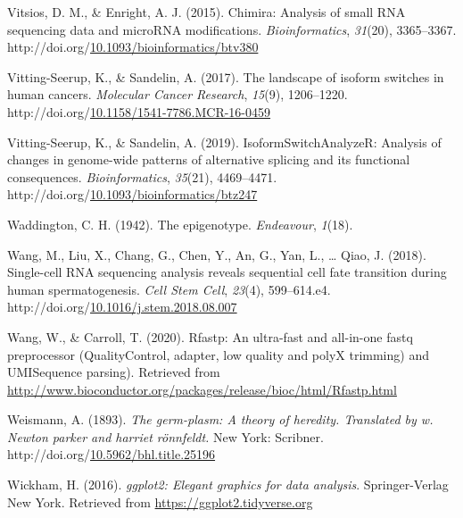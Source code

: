 \documentclass[12pt,twoside]{reedthesis}
\newlength{\cslhangindent}
\newenvironment{CSLReferences}[2] %
 {%
  \setlength{\parindent}{0pt}
  \ifodd #1 \everypar{\setlength{\hangindent}{\cslhangindent}}\ignorespaces\fi
  \ifnum #2 > 0
  \setlength{\parskip}{#2\baselineskip}
  \fi
 }%
 {}
\begin{document}
\begin{CSLReferences}{1}{0}
\leavevmode{}%
Vitsios, D. M., \& Enright, A. J. (2015). Chimira: Analysis of small RNA sequencing data and microRNA modifications. \emph{Bioinformatics}, \emph{31}(20), 3365--3367. http://doi.org/\href{https://doi.org/10.1093/bioinformatics/btv380}{10.1093/bioinformatics/btv380}

\leavevmode{}%
Vitting-Seerup, K., \& Sandelin, A. (2017). The landscape of isoform switches in human cancers. \emph{Molecular Cancer Research}, \emph{15}(9), 1206--1220. http://doi.org/\href{https://doi.org/10.1158/1541-7786.MCR-16-0459}{10.1158/1541-7786.MCR-16-0459}

\leavevmode{}%
Vitting-Seerup, K., \& Sandelin, A. (2019). IsoformSwitchAnalyzeR: Analysis of changes in genome-wide patterns of alternative splicing and its functional consequences. \emph{Bioinformatics}, \emph{35}(21), 4469--4471. http://doi.org/\href{https://doi.org/10.1093/bioinformatics/btz247}{10.1093/bioinformatics/btz247}

\leavevmode{}%
Waddington, C. H. (1942). The epigenotype. \emph{Endeavour}, \emph{1}(18).

\leavevmode{}%
Wang, M., Liu, X., Chang, G., Chen, Y., An, G., Yan, L., \ldots{} Qiao, J. (2018). Single-cell RNA sequencing analysis reveals sequential cell fate transition during human spermatogenesis. \emph{Cell Stem Cell}, \emph{23}(4), 599--614.e4. http://doi.org/\href{https://doi.org/10.1016/j.stem.2018.08.007}{10.1016/j.stem.2018.08.007}

\leavevmode{}%
Wang, W., \& Carroll, T. (2020). Rfastp: An ultra-fast and all-in-one fastq preprocessor (QualityControl, adapter, low quality and polyX trimming) and UMISequence parsing). Retrieved from \url{http://www.bioconductor.org/packages/release/bioc/html/Rfastp.html}

\leavevmode{}%
Weismann, A. (1893). \emph{The germ-plasm: A theory of heredity. Translated by w. Newton parker and harriet rönnfeldt.} New York: Scribner. http://doi.org/\href{https://doi.org/10.5962/bhl.title.25196}{10.5962/bhl.title.25196}

\leavevmode{}%
Wickham, H. (2016). \emph{ggplot2: Elegant graphics for data analysis}. Springer-Verlag New York. Retrieved from \url{https://ggplot2.tidyverse.org}


\end{CSLReferences}
\end{document}
